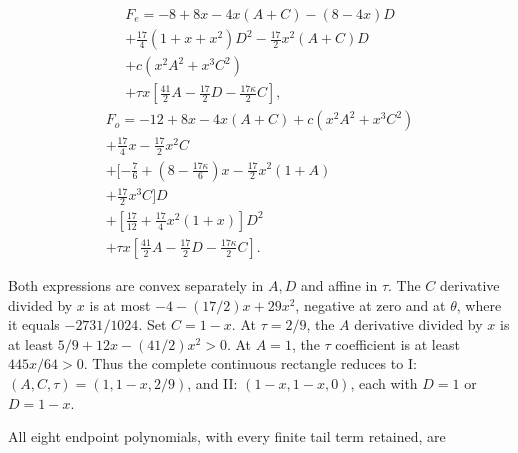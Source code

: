 \[
\begin{gathered}
F_e=-8+8x-4x(A+C)-(8-4x)D\\
+\tfrac{17}4(1+x+x^2)D^2-\tfrac{17}2x^2(A+C)D\\
+c(x^2A^2+x^3C^2)\\
+\tau x[\tfrac{41}2A-\tfrac{17}2D-\tfrac{17\kappa}2C],
\end{gathered}
\]
\[
\begin{gathered}
F_o=-12+8x-4x(A+C)+c(x^2A^2+x^3C^2)\\
+\tfrac{17}4x-\tfrac{17}2x^2C\\
+[-\tfrac76+(8-\tfrac{17\kappa}6)x-\tfrac{17}2x^2(1+A)\\
+\tfrac{17}2x^3C]D\\
+[\tfrac{17}{12}+\tfrac{17}4x^2(1+x)]D^2\\
+\tau x[\tfrac{41}2A-\tfrac{17}2D-\tfrac{17\kappa}2C].
\end{gathered}
\]

Both expressions are convex separately in \(A,\allowbreak \allowbreak  D\) and affine in \(\tau\). The \(C\) derivative divided by \(x\) is at most \(-4-(17/2)x+29x^2\), negative at zero and at \(\theta\), where it equals \(-2731/1024\). Set \(C=1-x\). At \(\tau=2/9\), the \(A\) derivative divided by \(x\) is at least \(5/9+12x-(41/2)x^2>0\). At \(A=1\), the \(\tau\) coefficient is at least \(445x/64>0\). Thus the complete continuous rectangle reduces to I: \((A,\allowbreak \allowbreak  C,\allowbreak \allowbreak  \tau)=(1,\allowbreak \allowbreak  1-x,\allowbreak \allowbreak  2/9)\), and II: \((1-x,\allowbreak \allowbreak  1-x,\allowbreak \allowbreak  0)\), each with \(D=1\) or \(D=1-x\).

All eight endpoint polynomials, with every finite tail term retained, are


